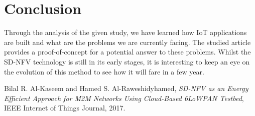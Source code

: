 \documentclass[10pt,journal,compsoc]{IEEEtran}
\begin{document}
\section{Conclusion}\label{sec:conclusion}

Through the analysis of the given study, we have learned how IoT 
applications are built and what are the problems we are currently facing. 
The studied article provides a proof-of-concept for a potential 
answer to these problems. Whilst the SD-NFV technology is still in its 
early stages, it is interesting to keep an eye on the evolution of 
this method to see how it will fare in a few year.

\begin{thebibliography}{9}
Bilal R. Al-Kaseem and Hamed S. Al-Raweshidyhamed, 
\emph{SD-NFV as an Energy Efficient Approach for M2M Networks Using 
Cloud-Based 6LoWPAN Testbed}, IEEE Internet of Things Journal, 2017.
\end{thebibliography}
\end{document}
